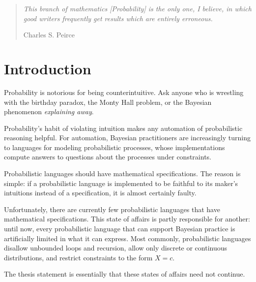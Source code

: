 \newcommand{\Normal}{\mathrm{Normal}}
\newcommand{\Borel}{\mathcal{B}}
\newcommand{\Ex}{\mathbb{E}}

\begin{quote}
\textit{This branch of mathematics [Probability] is the only one, I believe, in which good writers frequently get results which are entirely erroneous.}

\hfill Charles S. Peirce
\end{quote}

\section{Introduction}

Probability is notorious for being counterintuitive.
Ask anyone who is wrestling with the birthday paradox, the Monty Hall problem, or the Bayesian phenomenon \emph{explaining away}.

Probability's habit of violating intuition makes any automation of probabilistic reasoning helpful.
For automation, Bayesian practitioners are increasingly turning to languages for modeling probabilistic processes, whose implementations compute answers to questions about the processes under constraints.

Probabilistic languages should have mathematical specifications.
The reason is simple: if a probabilistic language is implemented to be faithful to its maker's intuitions instead of a specification, it is almost certainly faulty.

Unfortunately, there are currently few probabilistic languages that have mathematical specifications.
This state of affairs is partly responsible for another: until now, every probabilistic language that can support Bayesian practice is artificially limited in what it can express.
Most commonly, probabilistic languages disallow unbounded loops and recursion, allow only discrete or continuous distributions, and restrict constraints to the form $X = c$.

The thesis statement is essentially that these states of affairs need not continue.

\newpage


